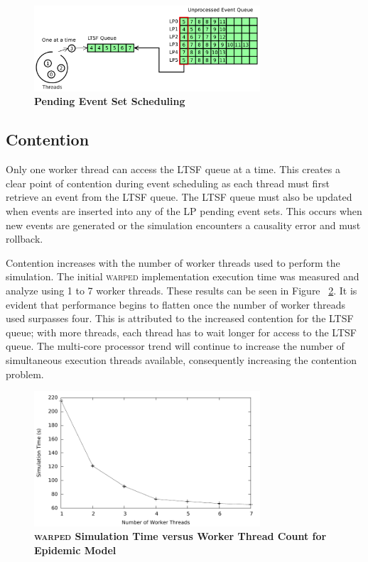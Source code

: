 \documentclass[11pt]{book}
\begin{document}
\begin{figure}[H]
    \centering
    \graphicspath{ {./figures/} }
    \includegraphics[width=0.75\textwidth,keepaspectratio]{single_ltsf_queue}
    \caption{\textbf{Pending Event Set Scheduling}}
    \label{fig:singleLTSFqueue}
\end{figure}

\subsection{Contention}

Only one worker thread can access the LTSF queue at a time.  This creates a clear point of
contention during event scheduling as each thread must first retrieve an event from the
LTSF queue.  The LTSF queue must also be updated when events are inserted into any of the
LP pending event sets.  This occurs when new events are generated or the simulation
encounters a causality error and must rollback.

Contention increases with the number of worker threads used to perform the
simulation.  The initial \textsc{warped} implementation execution time was
measured and analyze using 1 to 7 worker threads.  These results can be seen in
Figure ~\ref{fig:notsx_profile}.  It is evident that performance begins to
flatten once the number of worker threads used surpasses four.  This is
attributed to the increased contention for the LTSF queue; with more threads,
each thread has to wait longer for access to the LTSF queue.  The multi-core
processor trend will continue to increase the number of simultaneous execution
threads available, consequently increasing the contention problem.

\begin{figure}[H]
    \centering
    \graphicspath{ {./figures/} }
    \includegraphics[width=0.75\textwidth,keepaspectratio]{notsx_profile}
    \caption{\textbf{\textsc{warped} Simulation Time versus Worker Thread Count for
    Epidemic Model}}
    \label{fig:notsx_profile}
\end{figure}
\end{document}
